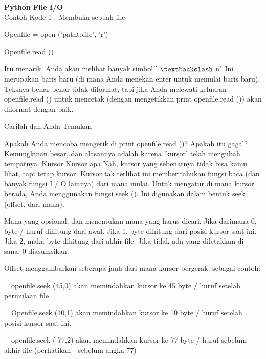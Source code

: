 \begin{center}{\fontsize{24pt}{24pt}\selectfont \textbf{Python File I/O} \\}
Contoh Kode 1 - Membuka sebuah file 

\vspace{12pt}

Openfile = open ('pathtofile', 'r')

Openfile.read () 

\vspace{12pt}

Itu menarik. Anda akan melihat banyak simbol ' $  \textbackslash  $ n'. Ini merupakan baris baru (di mana Anda menekan enter untuk memulai baris baru). Teksnya benar-benar tidak diformat, tapi jika Anda melewati keluaran openfile.read () untuk mencetak (dengan mengetikkan print openfile.read ()) akan diformat dengan baik. 

Carilah dan Anda Temukan 

\vspace{12pt}
 
Apakah Anda mencoba mengetik di print openfile.read ()? Apakah itu gagal? Kemungkinan besar, dan alasannya adalah karena 'kursor' telah mengubah tempatnya. Kursor Kursor apa Nah, kursor yang sebenarnya tidak bisa kamu lihat, tapi tetap kursor. Kursor tak terlihat ini memberitahukan fungsi baca (dan banyak fungsi I / O lainnya) dari mana mulai. Untuk mengatur di mana kursor berada, Anda menggunakan fungsi seek (). Ini digunakan dalam bentuk seek (offset, dari mana). 

\vspace{12pt}

Mana yang opsional, dan menentukan mana yang harus dicari. Jika darimana 0, byte / huruf dihitung dari awal. Jika 1, byte dihitung dari posisi kursor saat ini. Jika 2, maka byte dihitung dari akhir file. Jika tidak ada yang diletakkan di sana, 0 diasumsikan. 

\vspace{12pt}

Offset menggambarkan seberapa jauh dari mana kursor bergerak. sebagai contoh:

\vspace{12pt}
 
 $  $ $  $ $  $ $  $openfile.seek (45,0) akan memindahkan kursor ke 45 byte / huruf setelah permulaan file. 
 
 $  $ $  $ $  $ $  $Openfile.seek (10,1) akan memindahkan kursor ke 10 byte / huruf setelah posisi kursor saat ini. 
 
 $  $ $  $ $  $ $  $openfile.seek (-77,2) akan memindahkan kursor ke 77 byte / huruf sebelum akhir file (perhatikan - sebelum angka 77) 
 

\end{center}
